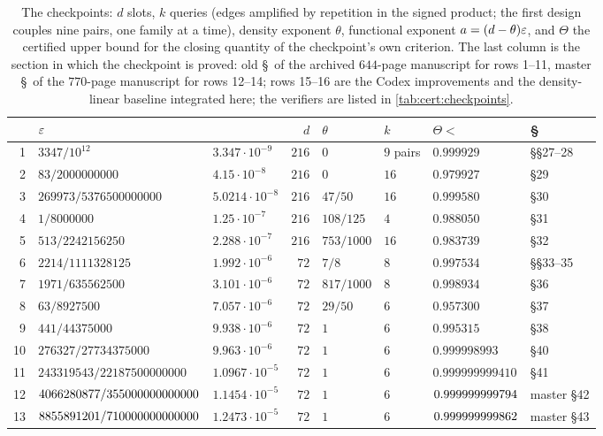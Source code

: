 \begin{table}[ht]
\centering
\footnotesize
\caption{The checkpoints: $d$ slots, $k$ queries (edges amplified
by repetition in the signed product; the first design couples
nine pairs, one family at a time), density exponent $\theta$,
functional exponent $a=(d-\theta)\varepsilon$, and $\Theta$ the certified upper bound
for the closing quantity of the checkpoint's own criterion. The last column
is the section in which the checkpoint is proved: old \S\ of the archived
$644$-page manuscript for rows 1--11, master \S\ of the $770$-page manuscript
for rows 12--14; rows 15--16 are the Codex improvements and the
density-linear baseline integrated here; the verifiers are listed in \cref{tab:cert:checkpoints}.}
\label{tab:history:checkpoints}
\begin{tabular}{@{}rllrlll l@{}}
\toprule
 & $\varepsilon$ & & $d$ & $\theta$ & $k$ & $\Theta<$ & \S\\
\midrule
1 & $3347/10^{12}$ & $3.347\cdot10^{-9}$ & $216$ & $0$ & $9$ pairs & $0.999929$ & \S\S27--28\\
2 & $83/2000000000$ & $4.15\cdot10^{-8}$ & $216$ & $0$ & $16$ & $0.979927$ & \S29\\
3 & $269973/5376500000000$ & $5.0214\cdot10^{-8}$ & $216$ & $47/50$ & $16$ & $0.999580$ & \S30\\
4 & $1/8000000$ & $1.25\cdot10^{-7}$ & $216$ & $108/125$ & $4$ & $0.988050$ & \S31\\
5 & $513/2242156250$ & $2.288\cdot10^{-7}$ & $216$ & $753/1000$ & $16$ & $0.983739$ & \S32\\
6 & $2214/1111328125$ & $1.992\cdot10^{-6}$ & $72$ & $7/8$ & $8$ & $0.997534$ & \S\S33--35\\
7 & $1971/635562500$ & $3.101\cdot10^{-6}$ & $72$ & $817/1000$ & $8$ & $0.998934$ & \S36\\
8 & $63/8927500$ & $7.057\cdot10^{-6}$ & $72$ & $29/50$ & $6$ & $0.957300$ & \S37\\
9 & $441/44375000$ & $9.938\cdot10^{-6}$ & $72$ & $1$ & $6$ & $0.995315$ & \S38\\
10 & $276327/27734375000$ & $9.963\cdot10^{-6}$ & $72$ & $1$ & $6$ & $0.999998993$ & \S40\\
11 & $243319543/22187500000000$ & $1.0967\cdot10^{-5}$ & $72$ & $1$ & $6$ & $0.999999999410$ & \S41\\
12 & {\renewcommand{\frac}[2]{#1/#2}$\ContinuationExponent$} & $1.1454\cdot10^{-5}$ & $72$ & $1$ & $6$ & $0.999999999794$ & master \S42\\
13 & {\renewcommand{\frac}[2]{#1/#2}$\AdvanceExponent$} & $1.2473\cdot10^{-5}$ & $72$ & $1$ & $6$ & $0.999999999862$ & master \S43\\

\end{tabular}
\end{table}
